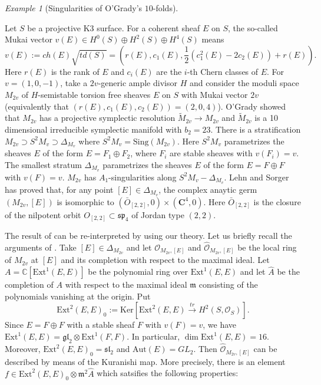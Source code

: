 \documentclass[12pt,a4paper]{amsart}
\theoremstyle{remark}
\newtheorem{ex}[Thm]{Example}
\theoremstyle{definition}
\def\dim{\operatorname{dim}}
\begin{document}
\begin{ex}[Singularities of O'Grady's $10$-folds]\label{O'Grady10}

Let $S$ be a projective K3 surface. For a coherent sheaf $E$ on $S$, 
the so-called Mukai vector 
$v(E) \in H^0(S) \oplus H^2(S) \oplus H^4(S)$ means 
$$v(E) := ch(E)\sqrt{td(S)} = (r(E), c_1(E), \frac{1}{2}(c_1^2(E) - 2c_2(E)) + r(E)).$$
Here $r(E)$ is the rank of $E$ and $c_i(E)$ are the $i$-th Chern classes of $E$. 
For $v = (1, 0, -1)$, take a $2v$-generic ample divisor $H$ and consider the moduli space $M_{2v}$ of $H$-semistable 
torsion free sheaves $E$ on $S$ with Mukai vector $2v$ (equivalently that $(r(E), c_1(E), c_2(E)) = (2, 0, 4)$). 
O'Grady \cite{O} showed that $M_{2v}$ has a projective symplectic resolution $\tilde{M}_{2v} \to M_{2v}$ and $\tilde{M}_{2v}$ 
is a 10 dimensional irreducible symplectic manifold with $b_2 = 23$. There is a stratification 
$M_{2v} \supset S^2M_v \supset \Delta_{M_v}$ where $S^2M_v = \mathrm{Sing}(M_{2v})$.  
Here $S^2M_v$ parametrizes the sheaves $E$ of the form $E = F_1 \oplus F_2$, where $F_i$ are stable sheaves with 
$v(F_i) = v$. The smallest stratum $\Delta_{M_v}$ parametrizes the sheaves $E$ of the form $E = F \oplus F$ with 
$v(F) = v$. $M_{2v}$ has $A_1$-singularities along $S^2M_v - \Delta_{M_v}$. Lehn and Sorger \cite{LS} has proved that, 
for any point $[E] \in \Delta_{M_v}$, the complex anaytic germ $(M_{2v}, [E])$ is isomorphic to $(\bar{O}_{[2,2]}, 0) \times (\mathbf{C}^4, 0)$. 
Here $\bar{O}_{[2,2]}$ is the closure of the nilpotent orbit $O_{[2,2]} \subset \mathfrak{sp}_4$ of Jordan type $(2,2)$.       

The result of \cite{LS} can be re-interpreted by using our theory. Let us briefly recall the arguments of \cite{LS}. 
Take $[E] \in \Delta_{M_{2v}}$ and let $\mathcal{O}_{{M_{2v}}, [E]}$ and $\hat{\mathcal{O}}_{{M_{2v}}, [E]}$ be the local ring of $M_{2v}$ at 
$[E]$ and its completion with respect to the maximal ideal. 
Let $A = \mathbb{C}[\mathrm{Ext}^1(E, E)]$ be the polynomial ring over $\mathrm{Ext}^1(E, E)$ and let $\hat{A}$ be 
the completion of $A$ with respect to the maximal ideal $\mathfrak{m}$ consisting of the polynomials vanishing at the 
origin. Put $$\mathrm{Ext}^2(E, E)_0 := \mathrm{Ker}[\mathrm{Ext}^2(E, E) \stackrel{tr}\to H^2(S, \mathcal{O}_S)].$$
Since $E = F \oplus F$ with a stable sheaf $F$ with $v(F) = v$, we have $\mathrm{Ext}^1(E, E) = \mathfrak{gl}_2 \otimes 
\mathrm{Ext}^1(F, F)$. In particular, $\dim \mathrm{Ext}^1(E, E) = 16$.  
Moreover, $\mathrm{Ext}^2(E, E)_0 = \mathfrak{sl}_2$ and $\mathrm{Aut}(E) = GL_2$. Then $\hat{\mathcal{O}}_{M_{2v}, [E]}$ can 
be described by means of the Kuranishi map. More precisely, there is an element $f \in \mathrm{Ext}^2(E, E)_0 \otimes 
\mathfrak{m}^2\hat{A}$ which satsifies the following properties: 


\end{ex}
\end{document}
